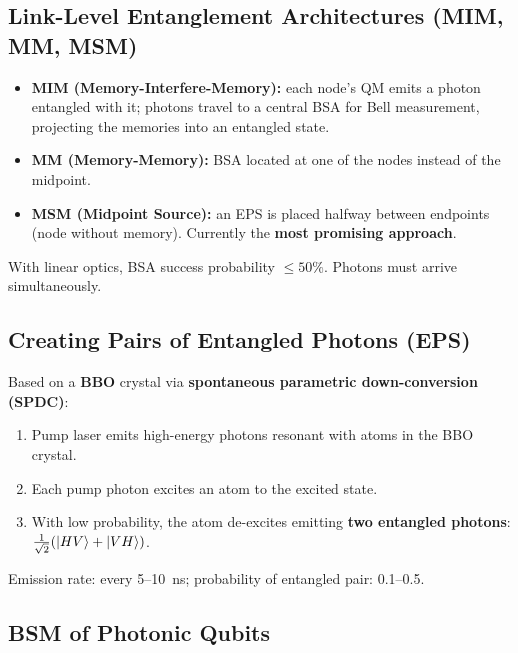 \documentclass[10pt,a4paper]{article}
\begin{document}
\subsection{Link-Level Entanglement Architectures (MIM, MM, MSM)}

\begin{tcolorbox}[defstyle, title={Definition}]
\begin{itemize}[nosep]
\item \textbf{MIM (Memory-Interfere-Memory):} each node's QM emits a photon entangled with it; photons travel to a central BSA for Bell measurement, projecting the memories into an entangled state.
\item \textbf{MM (Memory-Memory):} BSA located at one of the nodes instead of the midpoint.
\item \textbf{MSM (Midpoint Source):} an EPS is placed halfway between endpoints (node without memory). Currently the \textbf{most promising approach}.
\end{itemize}
With linear optics, BSA success probability $\leq 50\%$. Photons must arrive simultaneously.
\end{tcolorbox}

\subsection{Creating Pairs of Entangled Photons (EPS)}

\begin{tcolorbox}[defstyle, title={Definition}]
Based on a \textbf{BBO} crystal via \textbf{spontaneous parametric down-conversion (SPDC)}:
\begin{enumerate}[nosep]
\item Pump laser emits high-energy photons resonant with atoms in the BBO crystal.
\item Each pump photon excites an atom to the excited state.
\item With low probability, the atom de-excites emitting \textbf{two entangled photons}: $\tfrac{1}{\sqrt{2}}(\ket{HV}+\ket{VH})$.
\end{enumerate}
Emission rate: every 5--10~ns; probability of entangled pair: 0.1--0.5.
\end{tcolorbox}

\subsection{BSM of Photonic Qubits}
\end{document}
